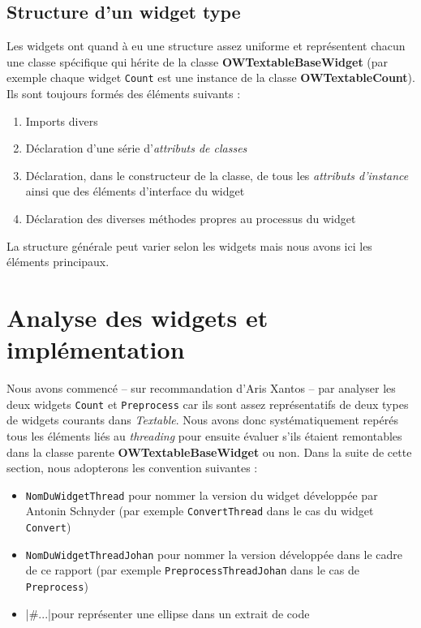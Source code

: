 \documentclass{article}
\begin{document}
\subsection{Structure d'un widget type}

Les widgets ont quand à eu une structure assez uniforme et représentent chacun une classe spécifique qui hérite de la classe \textbf{OWTextableBaseWidget} (par exemple chaque widget \texttt{Count} est une instance de la classe \textbf{OWTextableCount}). Ils sont toujours formés des éléments suivants : 

\begin{enumerate}
    \item Imports divers
    \item Déclaration d'une série d'\textit{attributs de classes}
    \item Déclaration, dans le constructeur de la classe, de tous les \textit{attributs d'instance} ainsi que des éléments d'interface du widget
    \item Déclaration des diverses méthodes propres au processus du widget
\end{enumerate}

La structure générale peut varier selon les widgets mais nous avons ici les éléments principaux.

\section{Analyse des widgets et implémentation}

Nous avons commencé – sur recommandation d'Aris Xantos – par analyser les deux widgets \texttt{Count} et \texttt{Preprocess} car ils sont assez représentatifs de deux types de widgets courants dans \textit{Textable}. Nous avons donc systématiquement repérés tous les éléments liés au \textit{threading} pour ensuite évaluer s'ils étaient remontables dans la classe parente \textbf{OWTextableBaseWidget} ou non. Dans la suite de cette section, nous adopterons les convention suivantes : 

\begin{itemize}
    \item \texttt{NomDuWidgetThread} pour nommer la version du widget développée par Antonin Schnyder (par exemple \texttt{ConvertThread} dans le cas du widget \texttt{Convert})
    \item \texttt{NomDuWidgetThreadJohan} pour nommer la version développée dans le cadre de ce rapport (par exemple \texttt{PreprocessThreadJohan} dans le cas de \texttt{Preprocess})
    \item {}|#...|pour représenter une ellipse dans un extrait de code
\end{itemize}
\end{document}
